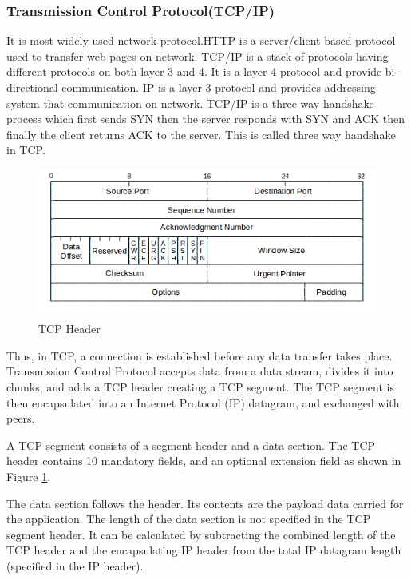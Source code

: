\documentclass[12pt]{article}
\theoremstyle{definition}
\begin{document}
			\subsubsection{Transmission Control Protocol(TCP/IP)}
			It  is  most  widely  used network  protocol.HTTP  is  a  server/client  based  protocol used to transfer web pages on network.
			TCP/IP is a stack of protocols having different protocols on both layer 3 and 4. It   is   a   layer 4 protocol and provide bi-directional communication. IP is a layer 3 protocol  and  provides addressing system that communication on  network. TCP/IP is a three way handshake process which first sends SYN then the server responds with SYN and ACK then finally the client returns ACK to the server. This is called three way handshake in TCP.
			
			\begin{figure}[!h]
				\centering
				\includegraphics[width=400pt]{pictures/tcp_header.png}
				\caption{TCP Header}
				\label{fig:tcp-header}
			\end{figure}
			
			Thus, in TCP, a connection is established before any data transfer takes place. Transmission Control Protocol accepts data from a data stream, divides it into chunks, and adds a TCP header creating a TCP segment. The TCP segment is then encapsulated into an Internet Protocol (IP) datagram, and exchanged with peers.
			
			A TCP segment consists of a segment header and a data section. The TCP header contains 10 mandatory fields, and an optional extension field as shown in Figure \ref{fig:tcp-header}.
			
			The data section follows the header. Its contents are the payload data carried for the application. The length of the data section is not specified in the TCP segment header. It can be calculated by subtracting the combined length of the TCP header and the encapsulating IP header from the total IP datagram length (specified in the IP header). 
			
\end{document}
